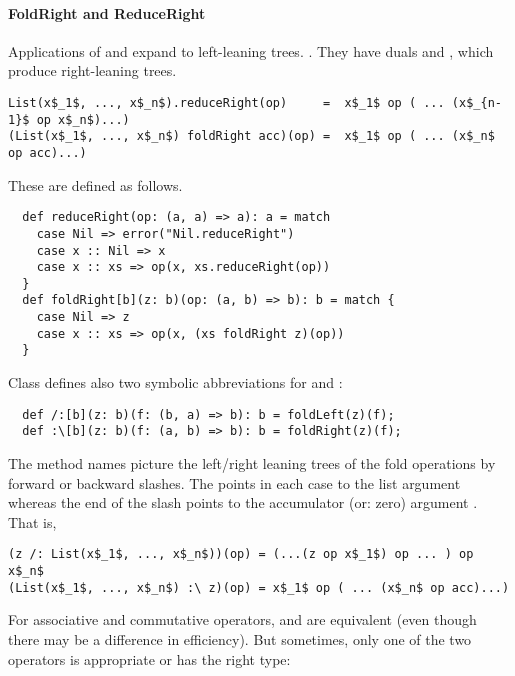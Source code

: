 \paragraph{FoldRight and ReduceRight}
Applications of  and  expand to
left-leaning trees. .  They have duals
 and , which produce right-leaning
trees.
\begin{lstlisting}
List(x$_1$, ..., x$_n$).reduceRight(op)     =  x$_1$ op ( ... (x$_{n-1}$ op x$_n$)...)
(List(x$_1$, ..., x$_n$) foldRight acc)(op) =  x$_1$ op ( ... (x$_n$ op acc)...)
\end{lstlisting}
These are defined as follows.
\begin{lstlisting}
  def reduceRight(op: (a, a) => a): a = match 
    case Nil => error("Nil.reduceRight")
    case x :: Nil => x
    case x :: xs => op(x, xs.reduceRight(op))
  }
  def foldRight[b](z: b)(op: (a, b) => b): b = match {
    case Nil => z
    case x :: xs => op(x, (xs foldRight z)(op))
  }
\end{lstlisting}

Class  defines also two symbolic abbreviations for
 and :
\begin{lstlisting}
  def /:[b](z: b)(f: (b, a) => b): b = foldLeft(z)(f);
  def :\[b](z: b)(f: (a, b) => b): b = foldRight(z)(f);
\end{lstlisting}
The method names picture the left/right leaning trees of the fold
operations by forward or backward slashes. The \code{:} points in each
case to the list argument whereas the end of the slash points to the
accumulator (or: zero) argument . 
That is, 
\begin{lstlisting}
(z /: List(x$_1$, ..., x$_n$))(op) = (...(z op x$_1$) op ... ) op x$_n$ 
(List(x$_1$, ..., x$_n$) :\ z)(op) = x$_1$ op ( ... (x$_n$ op acc)...)
\end{lstlisting}
For associative and commutative operators, \code{/:} and
\code{:\\} are equivalent (even though there may be a difference
in efficiency).  But sometimes, only one of the two operators is
appropriate or has the right type:

